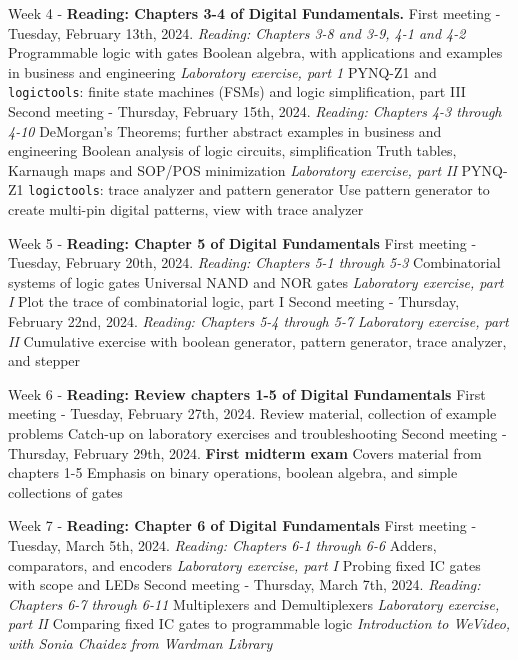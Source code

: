 \documentclass[10pt]{article}
\begin{document}
\begin{outline}[enumerate]
\1 Week 4 - \textbf{Reading: Chapters 3-4 of Digital Fundamentals.}
\2 First meeting - Tuesday, February 13th, 2024. \textit{Reading: Chapters 3-8 and 3-9, 4-1 and 4-2}
\3 Programmable logic with gates
\3 Boolean algebra, with applications and examples in business and engineering
\3 \textit{Laboratory exercise, part 1}
\4 PYNQ-Z1 and \verb+logictools+: finite state machines (FSMs) and logic simplification, part III
\2 Second meeting - Thursday, February 15th, 2024.  \textit{Reading: Chapters 4-3 through 4-10}
\3 DeMorgan's Theorems; further abstract examples in business and engineering
\3 Boolean analysis of logic circuits, simplification
\3 Truth tables, Karnaugh maps and SOP/POS minimization
\3 \textit{Laboratory exercise, part II}
\4 PYNQ-Z1 \verb+logictools+: trace analyzer and pattern generator
\4 Use pattern generator to create multi-pin digital patterns, view with trace analyzer

\1 Week 5 - \textbf{Reading: Chapter 5 of Digital Fundamentals}
\2 First meeting - Tuesday, February 20th, 2024. \textit{Reading:  Chapters 5-1 through 5-3}
\3 Combinatorial systems of logic gates
\3 Universal NAND and NOR gates
\3 \textit{Laboratory exercise, part I}
\4 Plot the trace of combinatorial logic, part I
\2 Second meeting - Thursday, February 22nd, 2024. \textit{Reading: Chapters 5-4 through 5-7}
\3 \textit{Laboratory exercise, part II}
\4 Cumulative exercise with boolean generator, pattern generator, trace analyzer, and stepper

\1 Week 6 - \textbf{Reading: Review chapters 1-5 of Digital Fundamentals}
\2 First meeting - Tuesday, February 27th, 2024.
\3 Review material, collection of example problems
\3 Catch-up on laboratory exercises and troubleshooting
\2 Second meeting - Thursday, February 29th, 2024.
\3 \textbf{First midterm exam}
\4 Covers material from chapters 1-5
\4 Emphasis on binary operations, boolean algebra, and simple collections of gates

\1 Week 7 - \textbf{Reading: Chapter 6 of Digital Fundamentals}
\2 First meeting - Tuesday, March 5th, 2024. \textit{Reading: Chapters 6-1 through 6-6}
\3 Adders, comparators, and encoders
\3 \textit{Laboratory exercise, part I}
\4 Probing fixed IC gates with scope and LEDs
\2 Second meeting - Thursday, March 7th, 2024. \textit{Reading: Chapters 6-7 through 6-11}
\3 Multiplexers and Demultiplexers
\3 \textit{Laboratory exercise, part II}
\4 Comparing fixed IC gates to programmable logic
\4 \textit{Introduction to WeVideo, with Sonia Chaidez from Wardman Library}


\end{outline}
\end{document}
